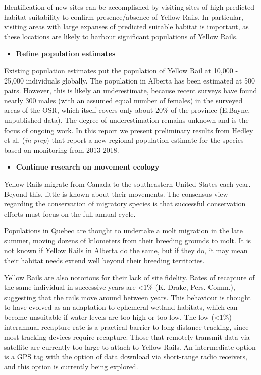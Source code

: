 \documentclass[11pt,]{article}
\providecommand{\tightlist}{%
  \setlength{\itemsep}{0pt}\setlength{\parskip}{0pt}}
\begin{document}
Identification of new sites can be accomplished by visiting sites of
high predicted habitat suitability to confirm presence/absence of Yellow
Rails. In particular, visiting areas with large expanses of predicted
suitable habitat is important, as these locations are likely to harbour
significant populations of Yellow Rails.

\begin{itemize}
\tightlist
\item
  \textbf{Refine population estimates}
\end{itemize}

Existing population estimates put the population of Yellow Rail at
10,000 - 25,000 individuals globally. The population in Alberta has been
estimated at 500 pairs. However, this is likely an underestimate,
because recent surveys have found nearly 300 males (with an assumed
equal number of females) in the surveyed areas of the OSR, which itself
covers only about 20\% of the province (E.Bayne, unpublished data). The
degree of underestimation remains unknown and is the focus of ongoing
work. In this report we present preliminary results from Hedley et al.
(\emph{in prep}) that report a new regional population estimate for the
species based on monitoring from 2013-2018.

\begin{itemize}
\tightlist
\item
  \textbf{Continue research on movement ecology}
\end{itemize}

Yellow Rails migrate from Canada to the southeastern United States each
year. Beyond this, little is known about their movements. The consensus
view regarding the conservation of migratory species is that successful
conservation efforts must focus on the full annual cycle.

Populations in Quebec are thought to undertake a molt migration in the
late summer, moving dozens of kilometers from their breeding grounds to
molt. It is not known if Yellow Rails in Alberta do the same, but if
they do, it may mean their habitat needs extend well beyond their
breeding territories.

Yellow Rails are also notorious for their lack of site fidelity. Rates
of recapture of the same individual in successive years are
\textless{}1\% (K. Drake, Pers. Comm.), suggesting that the rails move
around between years. This behaviour is thought to have evolved as an
adaptation to ephemeral wetland habitats, which can become unsuitable if
water levels are too high or too low. The low (\textless{}1\%)
interannual recapture rate is a practical barrier to long-distance
tracking, since most tracking devices require recapture. Those that
remotely transmit data via satellite are currently too large to attach
to Yellow Rails. An intermediate option is a GPS tag with the option of
data download via short-range radio receivers, and this option is
currently being explored.
\end{document}
